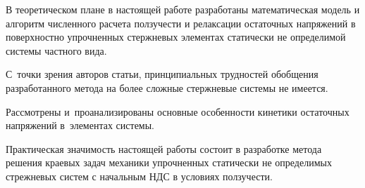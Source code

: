 


%


%

















В теоретическом плане в настоящей работе разработаны математическая модель и алгоритм численного расчета ползучести и релаксации остаточных напряжений в поверхностно упрочненных стержневых элементах статически не определимой системы частного вида.

С~точки зрения авторов статьи, принципиальных трудностей обобщения разработанного метода на более сложные стержневые системы не имеется.

Рассмотрены и~проанализированы основные особенности кинетики остаточных напряжений в~элементах системы.



Практическая значимость настоящей работы состоит в разработке метода  решения краевых задач механики упрочненных статически не определимых стрежневых систем с начальным НДС в условиях ползучести. 


